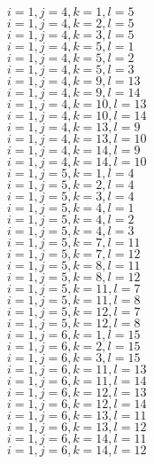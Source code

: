 \documentclass[14pt]{article}
\begin{document}
    $i=1,j=4,k=1,l=5 $ \\ 
    $i=1,j=4,k=2,l=5 $ \\ 
    $i=1,j=4,k=3,l=5 $ \\ 
    $i=1,j=4,k=5,l=1 $ \\ 
    $i=1,j=4,k=5,l=2 $ \\ 
    $i=1,j=4,k=5,l=3 $ \\ 
    $i=1,j=4,k=9,l=13 $ \\ 
    $i=1,j=4,k=9,l=14 $ \\ 
    $i=1,j=4,k=10,l=13 $ \\ 
    $i=1,j=4,k=10,l=14 $ \\ 
    $i=1,j=4,k=13,l=9 $ \\ 
    $i=1,j=4,k=13,l=10 $ \\ 
    $i=1,j=4,k=14,l=9 $ \\ 
    $i=1,j=4,k=14,l=10 $ \\ 
    $i=1,j=5,k=1,l=4 $ \\ 
    $i=1,j=5,k=2,l=4 $ \\ 
    $i=1,j=5,k=3,l=4 $ \\ 
    $i=1,j=5,k=4,l=1 $ \\ 
    $i=1,j=5,k=4,l=2 $ \\ 
    $i=1,j=5,k=4,l=3 $ \\ 
    $i=1,j=5,k=7,l=11 $ \\ 
    $i=1,j=5,k=7,l=12 $ \\ 
    $i=1,j=5,k=8,l=11 $ \\ 
    $i=1,j=5,k=8,l=12 $ \\ 
    $i=1,j=5,k=11,l=7 $ \\ 
    $i=1,j=5,k=11,l=8 $ \\ 
    $i=1,j=5,k=12,l=7 $ \\ 
    $i=1,j=5,k=12,l=8 $ \\ 
    $i=1,j=6,k=1,l=15 $ \\ 
    $i=1,j=6,k=2,l=15 $ \\ 
    $i=1,j=6,k=3,l=15 $ \\ 
    $i=1,j=6,k=11,l=13 $ \\ 
    $i=1,j=6,k=11,l=14 $ \\ 
    $i=1,j=6,k=12,l=13 $ \\ 
    $i=1,j=6,k=12,l=14 $ \\ 
    $i=1,j=6,k=13,l=11 $ \\ 
    $i=1,j=6,k=13,l=12 $ \\ 
    $i=1,j=6,k=14,l=11 $ \\ 
    $i=1,j=6,k=14,l=12 $ \\ 
\end{document}
